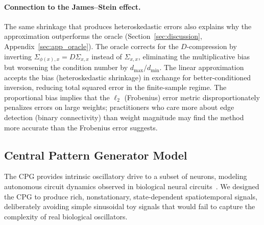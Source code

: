 \documentclass{article}
\begin{document}
\paragraph{Connection to the James--Stein effect.}
The same shrinkage that produces heteroskedastic errors also explains why the approximation outperforms the oracle (Section~\ref{sec:discussion}, Appendix~\ref{sec:app_oracle}).
The oracle corrects for the $D$-compression by inverting $\Sigma_{\phi(x),x} = D\Sigma_{x,x}$ instead of $\Sigma_{x,x}$, eliminating the multiplicative bias but worsening the condition number by $d_{\max}/d_{\min}$.
The linear approximation accepts the bias (heteroskedastic shrinkage) in exchange for better-conditioned inversion, reducing total squared error in the finite-sample regime.
The proportional bias implies that the $\ell_2$ (Frobenius) error metric disproportionately penalizes errors on large weights; practitioners who care more about edge detection (binary connectivity) than weight magnitude may find the method more accurate than the Frobenius error suggests.

\subsection{Central Pattern Generator Model}
\label{sec:app_cpg}

The CPG provides intrinsic oscillatory drive to a subset of neurons, modeling autonomous circuit dynamics observed in biological neural circuits~\citep{marder2001central}.
We designed the CPG to produce rich, nonstationary, state-dependent spatiotemporal signals, deliberately avoiding simple sinusoidal toy signals that would fail to capture the complexity of real biological oscillators.
\end{document}
